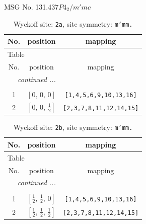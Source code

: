 \documentclass[fleqn,8pt]{jsarticle}
\begin{document}
\setcounter{MaxMatrixCols}{32}

\renewcommand{\tablename}{Table~}
\renewcommand{\figurename}{Figure~}
\begin{center}
\LARGE
MSG No. 131.437\quad$P4_{2}/m'mc$
\end{center}
\renewcommand{\arraystretch}{1.2}
\begin{longtable}{ccc}
\caption{Wyckoff site: {\tt 2a}, site symmetry: {\tt m'mm.}}
 \\
 \hline \hline
No. & position & mapping \\ \hline \endfirsthead

\multicolumn{2}{l}{\tablename\ \thetable{}} \\
 \hline \hline
No. & position & mapping \\ \hline \endhead

 \hline \hline
\multicolumn{2}{r}{\footnotesize\it continued ...} \\ \endfoot

 \hline \hline
\multicolumn{2}{r}{} \\ \endlastfoot

1 & $\left[ 0,\, 0,\, 0 \right]$ & {\tt [1,4,5,6,9,10,13,16]} \\ \hline
2 & $\left[ 0,\, 0,\, \frac{1}{2} \right]$ & {\tt [2,3,7,8,11,12,14,15]} \\
\end{longtable}
\renewcommand{\arraystretch}{1.2}
\begin{longtable}{ccc}
\caption{Wyckoff site: {\tt 2b}, site symmetry: {\tt m'mm.}}
 \\
 \hline \hline
No. & position & mapping \\ \hline \endfirsthead

\multicolumn{2}{l}{\tablename\ \thetable{}} \\
 \hline \hline
No. & position & mapping \\ \hline \endhead

 \hline \hline
\multicolumn{2}{r}{\footnotesize\it continued ...} \\ \endfoot

 \hline \hline
\multicolumn{2}{r}{} \\ \endlastfoot

1 & $\left[ \frac{1}{2},\, \frac{1}{2},\, 0 \right]$ & {\tt [1,4,5,6,9,10,13,16]} \\ \hline
2 & $\left[ \frac{1}{2},\, \frac{1}{2},\, \frac{1}{2} \right]$ & {\tt [2,3,7,8,11,12,14,15]} \\
\end{longtable}
\end{document}
